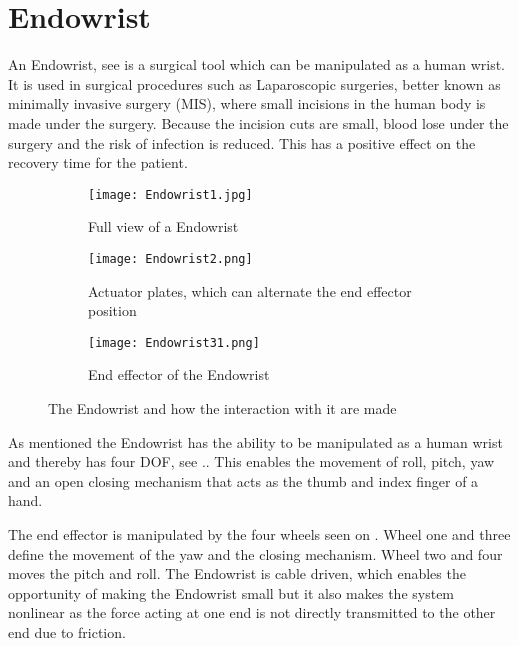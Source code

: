 \section{Endowrist}\label{sec:Endowrist}

An Endowrist, see  is a surgical tool which can be manipulated as a human wrist. It is used in surgical procedures such as Laparoscopic surgeries, better known as minimally invasive surgery (MIS), where small incisions in the human body is made under the surgery. Because the incision cuts are small, blood lose under the surgery and the risk of infection is reduced. This has a positive effect on the recovery time for the patient.


\begin{figure}[H]
	\centering
	\begin{subfigure}{.32\textwidth}
		\centering
		\texttt{[image: Endowrist1.jpg]}
		\caption{Full view of a Endowrist\vspace{8.5mm}   }
		\label{fig:Endo_full}
	\end{subfigure}
	\begin{subfigure}{.32\textwidth}
		\centering
		\texttt{[image: Endowrist2.png]}
		\caption{Actuator plates, which can alternate the end effector position}
		\label{fig:Endo_plates}
	\end{subfigure}
	\begin{subfigure}{.32\textwidth}
		\centering
		\texttt{[image: Endowrist31.png]}
		\caption{End effector of the Endowrist\newline}
		\label{fig:Endo_end}
	\end{subfigure}
\caption{The Endowrist and how the interaction with it are made}
\label{fig:endowrits_set}
\end{figure}

As mentioned the Endowrist has the ability to be manipulated as a human wrist and thereby has four \gls{DOF}, see .. This enables the movement of roll, pitch, yaw and an open closing mechanism that acts as the thumb and index finger of a hand. 

The end effector is manipulated by the four wheels seen on . Wheel one and three define the movement of the yaw and the closing mechanism. Wheel two and four moves the pitch and roll. The Endowrist is cable driven, which enables the opportunity of making the Endowrist small but it also makes the system nonlinear as the force acting at one end is not directly transmitted to the other end due to friction. 



